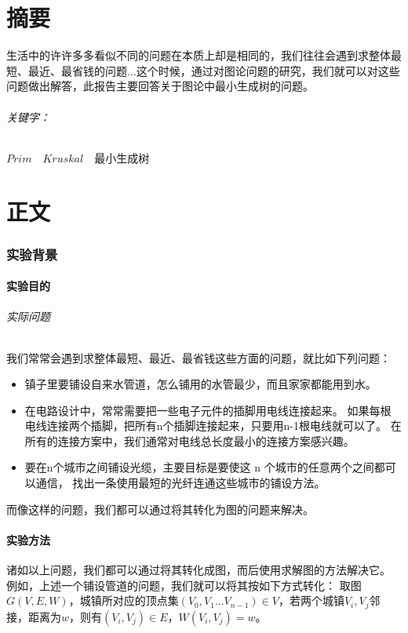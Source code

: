 \documentclass[a4paper,10pt]{ctexart}
\begin{document}
\part*{摘要}
生活中的许许多多看似不同的问题在本质上却是相同的，我们往往会遇到求整体最短、最近、最省钱的问题...这个时候，通过对图论问题的研究，我们就可以对这些问题做出解答，此报告主要回答关于图论中最小生成树的问题。
\\ \paragraph{关键字：}$Prim$\ \ $Kruskal$\ \ 最小生成树
\tableofcontents

\newpage
\part{正文}
\section{实验背景}

\subsection{实验目的}
\paragraph{实际问题} 我们常常会遇到求整体最短、最近、最省钱这些方面的问题，就比如下列问题：
\begin{itemize}
\item 镇子里要铺设自来水管道，怎么铺用的水管最少，而且家家都能用到水。
\item 在电路设计中，常常需要把一些电子元件的插脚用电线连接起来。 如果每根电线连接两个插脚，把所有n个插脚连接起来，只要用n-1根电线就可以了。 在所有的连接方案中，我们通常对电线总长度最小的连接方案感兴趣。
\item 要在n个城市之间铺设光缆，主要目标是要使这 n 个城市的任意两个之间都可以通信， 找出一条使用最短的光纤连通这些城市的铺设方法。
\end{itemize}
而像这样的问题，我们都可以通过将其转化为图的问题来解决。

\subsection{实验方法}
诸如以上问题，我们都可以通过将其转化成图，而后使用求解图的方法解决它。
例如，上述一个铺设管道的问题，我们就可以将其按如下方式转化：
取图$G(V,E,W)$，城镇所对应的顶点集$(V_0,V_1...V_{n-1}) \in V $，若两个城镇$V_i,V_j$邻接，距离为$w$，则有$(V_i,V_j)\in E$，$W(V_i,V_j)=w$。
\end{document}
